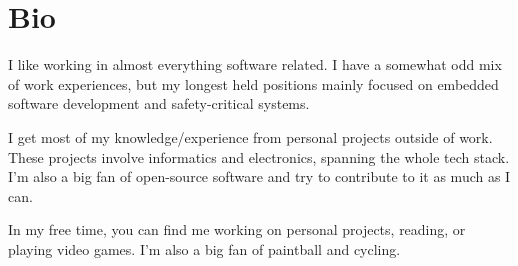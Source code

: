 \documentclass[letterpaper]{twentysecondcv} %
\begin{document}








\makeprofile %

\vfill


\section{Bio}

I like working in almost everything software related. I have a somewhat odd mix of work
experiences, but my longest held positions mainly focused on embedded software
development and safety-critical systems.

I get most of my knowledge/experience from personal projects outside of work. These
projects involve informatics and electronics, spanning the whole tech stack. I'm also
a big fan of open-source software and try to contribute to it as much as I can.

In my free time, you can find me working on personal projects, reading, or playing
video games. I'm also a big fan of paintball and cycling.
\end{document}
